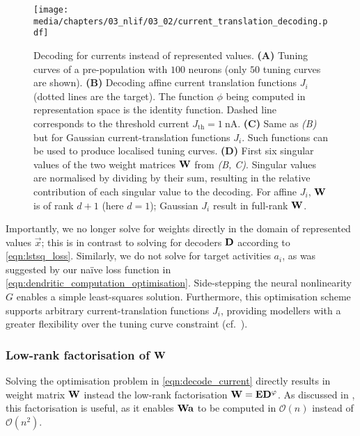 \begin{figure}
	\texttt{[image: media/chapters/03\_nlif/03\_02/current\_translation\_decoding.pdf]}%
	{\label{fig:current_translation_decoding_a}}%
	{\label{fig:current_translation_decoding_b}}%
	{\label{fig:current_translation_decoding_c}}%
	{\label{fig:current_translation_decoding_d}}%
	\caption[Decoding for currents instead of represented values]{Decoding for currents instead of represented values. \textbf{(A)} Tuning curves of a pre-population with $100$ \LIF neurons (only $50$ tuning curves are shown). \textbf{(B)} Decoding affine current translation functions $J_i$ (dotted lines are the target). The function $\phi$ being computed in re\-pre\-sen\-tat\-ion space is the identity function. Dashed line corresponds to the threshold current $J_\mathrm{th} = \SI{1}{\nano\ampere}$.
	\textbf{(C)} Same as \emph{(B)} but for Gaussian current-translation functions $J_i$. Such functions can be used to produce localised tuning curves.
	\textbf{(D)} First six singular values of the two weight matrices $\mathbf{W}$ from \emph{(B, C)}.
	Singular values are normalised by dividing by their sum, resulting in the relative contribution of each singular value to the decoding.
	For affine $J_i$, $\mathbf{W}$ is of rank $d + 1$ (here $d = 1$);
	Gaussian $J_i$ result in full-rank $\mathbf{W}$.
	}
\end{figure}

Importantly, we no longer solve for weights directly in the domain of represented values $\vec x$; this is in contrast to solving for decoders $\mathbf{D}$ according to \cref{eqn:lstsq_loss}.
Similarly, we do not solve for target activities $a_i$, as was suggested by our na\"ive loss function in \cref{eqn:dendritic_computation_optimisation}.
Side-stepping the neural nonlinearity $G$ enables a simple least-squares solution.
Furthermore, this optimisation scheme supports arbitrary current-translation functions $J_i$, providing modellers with a greater flexibility over the tuning curve constraint (cf.~).

\subsubsection{Low-rank factorisation of $\mathbf{W}$}
Solving the optimisation problem in \cref{eqn:decode_current} directly results in weight matrix $\mathbf{W}$ instead the low-rank factorisation $\mathbf{W} = \mathbf{E} \mathbf{D}^\varphi$.
As discussed in , this factorisation is useful, as it enables $\mathbf{W} \mathbf{a}$ to be computed in $\mathcal{O}(n)$ instead of $\mathcal{O}(n^2)$.

